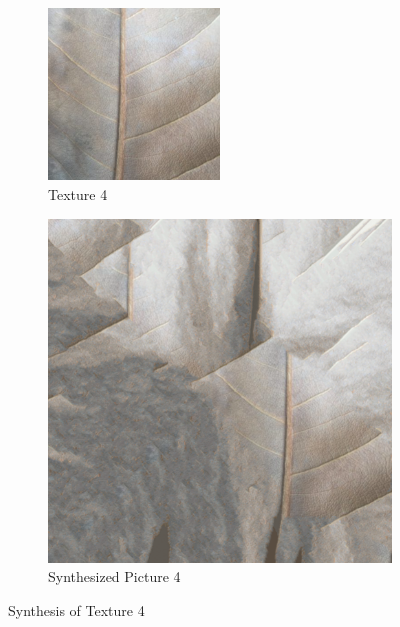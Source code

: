 \documentclass{article}
\begin{document}
\begin{figure}[htbp!]
    \centering
    \begin{subfigure}[b]{0.49\textwidth}
        \centering
        \includegraphics[width=0.5\textwidth]{../Code/Textures/4.png}
        \caption{Texture 4}
        \label{fig:original-4}
    \end{subfigure}
    \hfill %
    \begin{subfigure}[b]{0.49\textwidth}
        \centering
        \includegraphics[width=\textwidth]{../Result/4.png}
        \caption{Synthesized Picture 4}
        \label{fig:synthesized-4}
    \end{subfigure}
    \caption{Synthesis of Texture 4}
    \label{fig:synthesis-4}
\end{figure}
\end{document}
